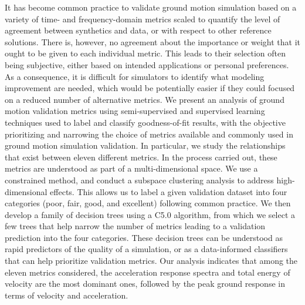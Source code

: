 % 
It has become common practice to validate ground motion simulation based on a variety of time- and frequency-domain metrics scaled to quantify the level of agreement between synthetics and data, or with respect to other reference solutions. There is, however, no agreement about the importance or weight that it ought to be given to each individual metric. This leads to their selection often being subjective, either based on intended applications or personal preferences. As a consequence, it is difficult for simulators to identify what modeling improvement are needed, which would be potentially easier if they could focused on a reduced number of alternative metrics. We present an analysis of ground motion validation metrics using semi-supervised and supervised learning techniques used to label and classify goodness-of-fit results, with the objective prioritizing and narrowing the choice of metrics available and commonly used in ground motion simulation validation. In particular, we study the relationships that exist between eleven different metrics. In the process carried out, these metrics are understood as part of a multi-dimensional space. We use a constrained \kmeans{} method, and conduct a subspace clustering analysis to address high-dimensional effects. This allows us to label a given validation dataset into four categories (poor, fair, good, and excellent) following common practice. We then develop a family of decision trees using a C5.0 algorithm, from which we select a few trees that help narrow the number of metrics leading to a validation prediction into the four categories. These decision trees can be understood as rapid predictors of the quality of a simulation, or as a data-informed classifiers that can help prioritize validation metrics. Our analysis indicates that among the eleven metrics considered, the acceleration response spectra and total energy of velocity are the most dominant ones, followed by the peak ground response in terms of velocity and acceleration.
